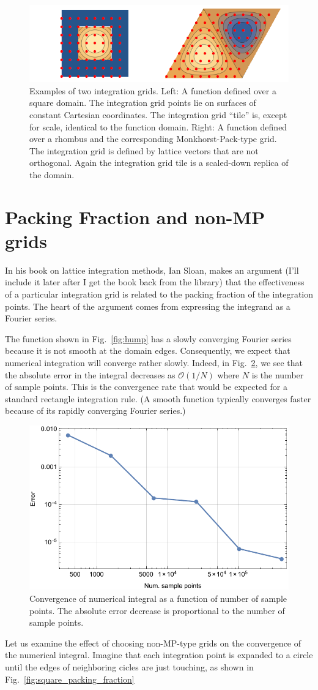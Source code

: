 \documentclass[fontsize=11pt]{scrartcl}
\numberwithin{equation}{section} %
\numberwithin{figure}{section} %
\numberwithin{table}{section} %
\begin{document}
\begin{figure}
\includegraphics[width=.75\linewidth]{figs/mp_example.png}
\caption{Examples of two integration grids. Left: A function
  defined over a square domain. The integration grid points lie on surfaces of constant Cartesian
  coordinates. The integration grid ``tile'' is, except for scale, identical to the function
  domain. Right: A function defined over a rhombus and the corresponding Monkhorst-Pack-type
  grid. The integration grid is defined by lattice vectors that are not orthogonal. Again the
  integration grid tile is a scaled-down replica of the domain.\label{fig:MPgrid}}
\end{figure}

\section{Packing Fraction and non-MP grids}
In his book on lattice integration methods, Ian Sloan, makes an argument (I'll include it later
after I get the book back from the library) that the effectiveness of a particular integration grid
is related to the packing fraction of the integration points. The heart of the argument comes from
expressing the integrand as a Fourier series.

The function shown in Fig.~\ref{fig:hump} has a slowly converging Fourier series because it is not
smooth at the domain edges. Consequently, we expect that numerical integration will converge rather
slowly. Indeed, in Fig.~\ref{fig:convergence}, we see that the absolute error in the integral
decreases as $\mathcal{O}(1/N)$ where $N$ is the number of sample points. This is the convergence
rate that would be expected for a standard rectangle integration rule. (A smooth function typically
converges faster because of its rapidly converging Fourier series.)

\begin{figure}
\includegraphics[width=.75\linewidth]{figs/convergence.pdf}
\caption{Convergence of numerical integral as a function of number of sample points. The absolute
  error decrease is proportional to the number of sample points.\label{fig:convergence}}
\end{figure}

Let us examine the effect of choosing non-MP-type grids on the convergence of the numerical
integral. Imagine that each integration point is expanded to a circle until the edges of neighboring
cicles are just touching, as shown in Fig.~\ref{fig:square_packing_fraction}
\end{document}
